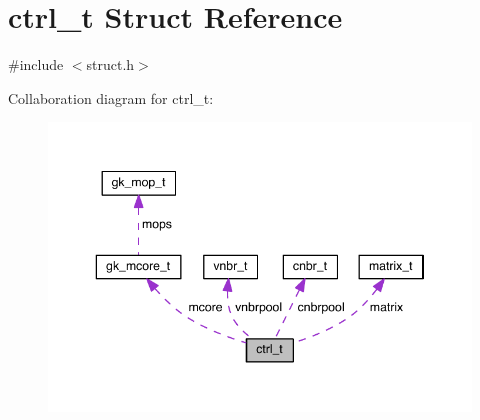 \hypertarget{a00742}{}\section{ctrl\+\_\+t Struct Reference}
\label{a00742}


{\ttfamily \#include $<$struct.\+h$>$}



Collaboration diagram for ctrl\+\_\+t\+:\nopagebreak
\begin{figure}[H]
\begin{center}
\leavevmode
\includegraphics[width=346pt]{a00740}
\end{center}
\end{figure}

